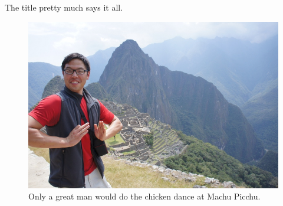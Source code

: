 The title pretty much says it all.

\begin{figure}
\centering
\includegraphics[width=\textwidth]{chapter1/figures/chickendance.JPG}
\caption{Only a great man would do the chicken dance at Machu Picchu.\label{pic:chickendance}}
\end{figure} 















